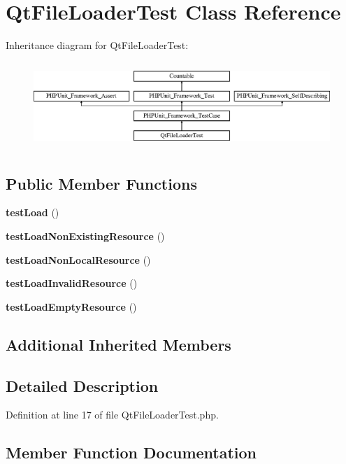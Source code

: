 \section{Qt\+File\+Loader\+Test Class Reference}
\label{class_symfony_1_1_component_1_1_translation_1_1_tests_1_1_loader_1_1_qt_file_loader_test}
Inheritance diagram for Qt\+File\+Loader\+Test\+:\begin{figure}[H]
\begin{center}
\leavevmode
\includegraphics[height=3.303835cm]{class_symfony_1_1_component_1_1_translation_1_1_tests_1_1_loader_1_1_qt_file_loader_test}
\end{center}
\end{figure}
\subsection*{Public Member Functions}
\begin{DoxyCompactItemize}
\item 
{\bf test\+Load} ()
\item 
{\bf test\+Load\+Non\+Existing\+Resource} ()
\item 
{\bf test\+Load\+Non\+Local\+Resource} ()
\item 
{\bf test\+Load\+Invalid\+Resource} ()
\item 
{\bf test\+Load\+Empty\+Resource} ()
\end{DoxyCompactItemize}
\subsection*{Additional Inherited Members}


\subsection{Detailed Description}


Definition at line 17 of file Qt\+File\+Loader\+Test.\+php.



\subsection{Member Function Documentation}
